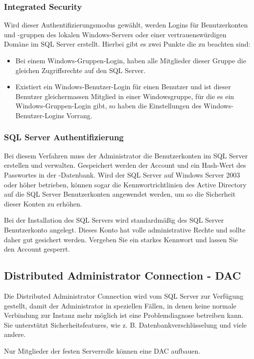         \subsubsection{Integrated Security}
          Wird dieser Authentifizierungsmodus gewählt, werden
          Logins für Benutzerkonten und -gruppen des lokalen Windows-Servers
          oder einer vertrauenswürdigen Domäne im SQL Server erstellt.
          Hierbei gibt es zwei Punkte die zu beachten sind:
          \begin{itemize}
            \item Bei einem Windows-Gruppen-Login, haben alle Mitglieder dieser
            Gruppe die gleichen Zugriffsrechte auf den SQL Server.
            \item Existiert ein Windows-Benutzer-Login für einen Benutzer und
            ist dieser Benutzer gleichermassen Mitglied in einer Windowsgruppe,
            für die es ein Windows-Gruppen-Login gibt, so haben die
            Einstellungen des Windows-Benutzer-Logins Vorrang.
          \end{itemize}
        \subsubsection{SQL Server Authentifizierung}
          Bei diesem Verfahren muss der Administrator die Benutzerkonten im
          SQL Server erstellen und verwalten. Gespeichert werden der Account
          und ein Hash-Wert des Passwortes in der -Datenbank.
          Wird der SQL Server auf Windows Server 2003 oder höher betrieben,
          können sogar die Kennwortrichtlinien des Active Directory auf die SQL
          Server Benutzerkonten angewendet werden, um so die Sicherheit dieser Konten
         zu erhöhen.
         
         Bei der Installation des SQL Servers wird standardmäßig des SQL Server
         Benutzerkonto  angelegt. Dieses Konto hat volle
         administrative Rechte und sollte daher gut gesichert werden. Vergeben
         Sie ein starkes Kennwort und lassen Sie den Account gesperrt.
\clearpage
      \subsection{Distributed Administrator Connection - DAC}
        Die Distributed Administrator Connection wird vom SQL Server zur
        Verfügung gestellt, damit der Administrator in speziellen Fällen, in
        denen keine normale Verbindung zur Instanz mehr möglich ist eine
        Problemdiagnose betreiben kann. Sie unterstützt Sicherheitsfeatures, wie
        z. B. Datenbankverschlüsselung und viele andere.
        \begin{merke}
          Nur Mitglieder der festen Serverrolle  können
          eine DAC aufbauen.
        \end{merke}
